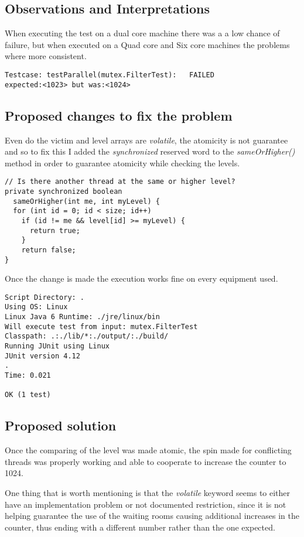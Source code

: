 
\subsection{Observations and Interpretations}

\par
When executing the test on a dual core machine there was a a low chance of failure, but when executed on a Quad core and Six core machines the problems where more consistent.
\begin{lstlisting}[frame=single]
Testcase: testParallel(mutex.FilterTest):	FAILED
expected:<1023> but was:<1024>
\end{lstlisting}



\subsection{Proposed changes to fix the problem}

\par
Even do the victim and level arrays are \textit{volatile}, the atomicity is not guarantee and so to fix this I added the \textit{synchronized} reserved word to the \textit{sameOrHigher()} method in order to guarantee atomicity while checking the levels.
\begin{lstlisting}[frame=single,breaklines=true]
// Is there another thread at the same or higher level?
private synchronized boolean 
  sameOrHigher(int me, int myLevel) {
  for (int id = 0; id < size; id++)
    if (id != me && level[id] >= myLevel) {
      return true;
    }
    return false;
}
\end{lstlisting}
Once the change is made the execution works fine on every equipment used.
\begin{lstlisting}[frame=single,breaklines=true]
Script Directory: .
Using OS: Linux
Linux Java 6 Runtime: ./jre/linux/bin
Will execute test from input: mutex.FilterTest
Classpath: .:./lib/*:./output/:./build/
Running JUnit using Linux
JUnit version 4.12
.
Time: 0.021

OK (1 test)
\end{lstlisting}



\subsection{Proposed solution}
\par
Once the comparing of the level was made atomic, the spin made for conflicting threads was properly working and able to cooperate to increase the counter to 1024.
\par
One thing that is worth mentioning is that the \textit{volatile} keyword seems to either have an implementation problem or not documented restriction, since it is not helping guarantee the use of the waiting rooms causing additional increases in the counter, thus ending with a different number rather than the one expected.

